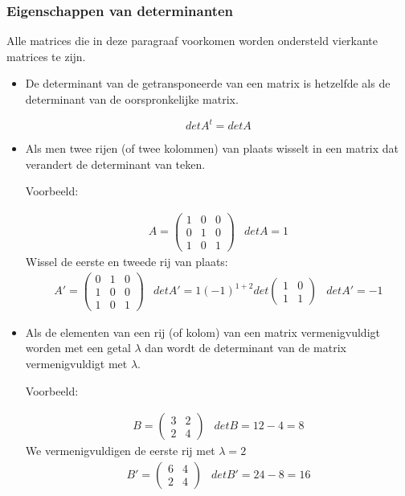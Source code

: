 \subsubsection{Eigenschappen van determinanten}

Alle matrices die in deze paragraaf voorkomen worden ondersteld vierkante matrices te zijn. 

\begin{itemize}
	\item De determinant van de getransponeerde van een matrix is hetzelfde als de determinant van de oorspronkelijke matrix.
	
	\[ det A^{t}=det A \]
	
	\item Als men twee rijen (of twee kolommen) van plaats wisselt in een matrix dat verandert de determinant van teken. 
	
	Voorbeeld:
	
	\[ \begin{array}{ll} A=\left( \begin{matrix}
	1 & 0 & 0 \\ 0 & 1 & 0 \\ 1 & 0 & 1
	\end{matrix} \right) & det A = 1 \end{array} \]
	Wissel de eerste en tweede rij van plaats:
	\[ \begin{array}{lll} A'=\left( \begin{matrix}
	0 & 1 & 0 \\ 1 & 0 & 0 \\ 1 & 0 & 1
	\end{matrix} \right) & det A'=1(-1)^{1+2}det \left( \begin{matrix} 1 & 0 \\ 1 & 1 \end{matrix} \right) & det A'=-1 \end{array} \]
	
	\item Als de elementen van een rij (of kolom) van een matrix vermenigvuldigt worden met een getal $\lambda$ dan wordt de determinant van de matrix vermenigvuldigt met $\lambda$.
	
	Voorbeeld:
	
	\[ \begin{array}{ll} B=\left( \begin{matrix}
	3 & 2 \\ 2 & 4 
	\end{matrix} \right) & det B=12-4=8 \end{array} \]
	We vermenigvuldigen de eerste rij met $\lambda=2$
	\[ \begin{array}{ll} B'=\left( \begin{matrix}
	6 & 4 \\ 2 & 4
	\end{matrix} \right) & det B'=24-8=16 \end{array} \]
	

\end{itemize}
